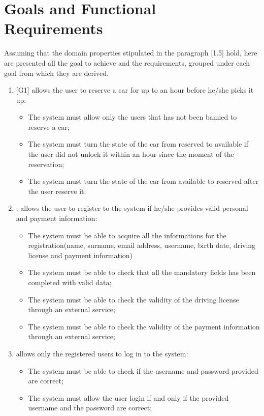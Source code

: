 \section{Goals and Functional Requirements}
Assuming that the domain properties stipulated in the paragraph [1.5] hold, here are presented all the goal to  achieve and the requirements, grouped under each goal from which they are derived.

\begin{enumerate}

\item {[G1]} allows the user to reserve a car for up to an hour before he/she picks it up:

\begin{itemize}
	\item The system must allow only the users that has not been banned to reserve a car;
	\item The system must turn the state of the car from reserved to available if the user did not unlock it within an hour since the moment of the reservation;
	\item The system must turn the state of the car from available to reserved after the user reserve it;
\end{itemize}

\item: allows the user to register to the system if he/she provides valid personal and payment information:

\begin{itemize}
	\item The system must be able to acquire all the informations for the registration(name, surname, email address, username, birth date, driving license and payment information)
	\item The system must be able to check that all the mandatory fields has been completed with valid data;
	\item The system must be able to check the validity of the driving license through an external service;
	\item The system must be able to check the validity of the payment information through an external service;
\end{itemize}

\item allows only the registered users to log in to the system:

\begin{itemize}
	\item The system must be able to check if the username and password provided are correct;
	\item The system must allow the user login if and only if the provided username and the password are correct;
\end{itemize}


\end{enumerate}
